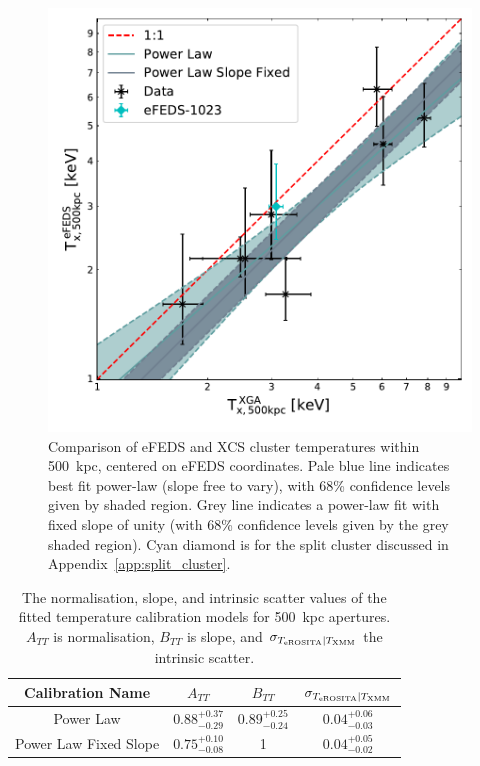 \documentclass[fleqn,usenatbib]{mnras}
\begin{document}
\begin{figure}
    \centering
    \includegraphics[width=0.95\columnwidth]{images/efeds_xcs_t500cal.pdf}
    \caption[]{Comparison of eFEDS and XCS cluster temperatures within 500~kpc, centered on eFEDS coordinates. Pale blue line indicates best fit power-law (slope free to vary), with 68\% confidence levels given by shaded region. Grey line indicates a power-law fit with fixed slope of unity (with 68\% confidence levels given by the grey shaded region). Cyan diamond is for the split cluster discussed in Appendix~\ref{app:split_cluster}.}
    \label{fig:t500kpccomp}
\end{figure}

\begin{table}
\begin{center}
\caption[]{{\small The normalisation, slope, and intrinsic scatter values of the fitted temperature calibration models for 500~kpc apertures. $A_{TT}$ is normalisation, $B_{TT}$ is slope, and $\sigma_{T_{\rm{eROSITA}}|T_{\rm{XMM}}}$ the intrinsic scatter.}\label{tab:tempcal}}
\vspace{1mm}
\begin{tabular}{cccc}
\hline
\hline
Calibration Name & $A_{TT}$ & $B_{TT}$ & $\sigma_{T_{\rm{eROSITA}}|T_{\rm{XMM}}}$\\
\hline
\hline
Power Law & $0.88^{+0.37}_{-0.29}$ & $0.89^{+0.25}_{-0.24}$ & $0.04^{+0.06}_{-0.03}$ \\
\hline
Power Law Fixed Slope & $0.75^{+0.10}_{-0.08}$ & 1 & $0.04^{+0.05}_{-0.02}$ \\
\hline
\end{tabular}
\end{center}
\end{table}
\end{document}
